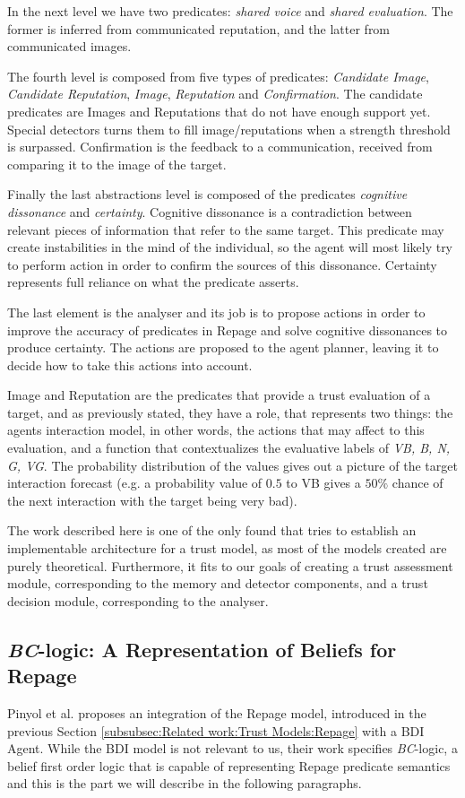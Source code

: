 In the next level we have two predicates: \textit{shared voice} and \textit{shared evaluation}. The former is inferred from communicated reputation, and the latter from communicated images. 

The fourth level is composed from five types of predicates: \textit{Candidate Image}, \textit{Candidate Reputation}, \textit{Image}, \textit{Reputation} and \textit{Confirmation}. The candidate predicates are Images and Reputations that do not have enough support yet. Special detectors turns them to fill image/reputations when a strength threshold is surpassed. Confirmation is the feedback to a communication, received from comparing it to the image of the target. 

Finally the last abstractions level is composed of the predicates \textit{cognitive dissonance} and \textit{certainty}. Cognitive dissonance is a contradiction between relevant pieces of information that refer to the same target. This predicate may create instabilities in the mind of the individual, so the agent will most likely try to perform action in order to confirm the sources of this dissonance. Certainty represents full reliance on what the predicate asserts.

The last element is the analyser and its job is to propose actions in order to improve the accuracy of predicates in Repage and solve cognitive dissonances to produce certainty. The actions are proposed to the agent planner, leaving it to decide how to take this actions into account.

Image and Reputation are the predicates that provide a trust evaluation of a target, and as previously stated, they have a role, that represents two things: the agents interaction model, in other words, the actions that may affect to this evaluation, and a function that contextualizes the evaluative labels of \textit{VB, B, N, G, VG}. The probability distribution of the values gives out a picture of the target interaction forecast (e.g. a probability value of $0.5$ to VB gives a $50\%$ chance of the next interaction with the target being very bad).

The work described here is one of the only found that tries to establish an implementable architecture for a trust model, as most of the models created are purely theoretical. Furthermore, it fits to our goals of creating a trust assessment module, corresponding to the memory and detector components, and a trust decision module, corresponding to the analyser.


\subsection{\textit{BC}-logic: A Representation of Beliefs for Repage}
\label{subsec:Related work:Trust Models:BDI + Repage}
Pinyol et al.\cite{Pinyol2009} proposes an integration of the Repage model, introduced in the previous Section \ref{subsubsec:Related work:Trust Models:Repage} with a \ac{BDI} Agent\cite{Rao1995}. While the \ac{BDI} model is not relevant to us, their work specifies \textit{BC}-logic, a belief first order logic that is capable of representing Repage predicate semantics and this is the part we will describe in the following paragraphs.

